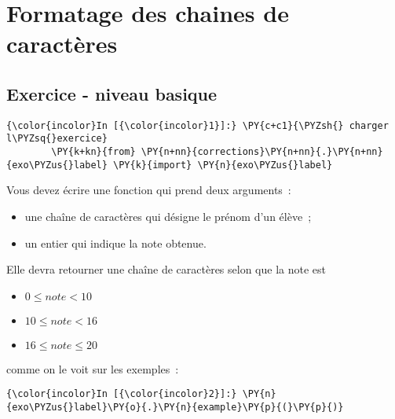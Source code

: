     
    
    
    

    

    \hypertarget{formatage-des-chaines-de-caractuxe8res}{%
\section{Formatage des chaines de
caractères}\label{formatage-des-chaines-de-caractuxe8res}}

    \hypertarget{exercice---niveau-basique}{%
\subsection{Exercice - niveau basique}\label{exercice---niveau-basique}}

    \begin{Verbatim}[commandchars=\\\{\},frame=single,framerule=0.3mm,rulecolor=\color{cellframecolor}]
{\color{incolor}In [{\color{incolor}1}]:} \PY{c+c1}{\PYZsh{} charger l\PYZsq{}exercice}
        \PY{k+kn}{from} \PY{n+nn}{corrections}\PY{n+nn}{.}\PY{n+nn}{exo\PYZus{}label} \PY{k}{import} \PY{n}{exo\PYZus{}label}
\end{Verbatim}


    Vous devez écrire une fonction qui prend deux arguments~:

\begin{itemize}
\tightlist
\item
  une chaîne de caractères qui désigne le prénom d'un élève~;
\item
  un entier qui indique la note obtenue.
\end{itemize}

Elle devra retourner une chaîne de caractères selon que la note est

\begin{itemize}
\tightlist
\item
  \(0 \leqslant note \lt 10\)
\item
  \(10 \leqslant note \lt 16\)
\item
  \(16 \leqslant note \leqslant 20\)
\end{itemize}

comme on le voit sur les exemples~:

    \begin{Verbatim}[commandchars=\\\{\},frame=single,framerule=0.3mm,rulecolor=\color{cellframecolor}]
{\color{incolor}In [{\color{incolor}2}]:} \PY{n}{exo\PYZus{}label}\PY{o}{.}\PY{n}{example}\PY{p}{(}\PY{p}{)}
\end{Verbatim}


